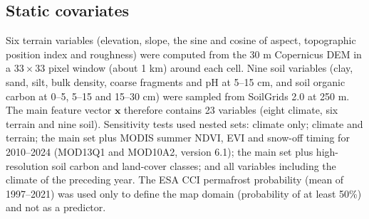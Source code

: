 \subsection{Static covariates}
Six terrain variables (elevation, slope, the sine and cosine of aspect, topographic position index and roughness) were computed from the 30 m Copernicus DEM\cite{CopDEM2021} in a $33\times33$ pixel window (about 1 km) around each cell. Nine soil variables (clay, sand, silt, bulk density, coarse fragments and pH at 5--15 cm, and soil organic carbon at 0--5, 5--15 and 15--30 cm) were sampled from SoilGrids 2.0 at 250 m\cite{Poggio2021}. The main feature vector $\mathbf{x}$ therefore contains 23 variables (eight climate, six terrain and nine soil). Sensitivity tests used nested sets: climate only; climate and terrain; the main set plus MODIS summer NDVI, EVI and snow-off timing for 2010--2024 (MOD13Q1 and MOD10A2, version 6.1)\cite{Didan2021,HallRiggs2021}; the main set plus high-resolution soil carbon and land-cover classes\cite{Palmtag2022}; and all variables including the climate of the preceding year. The ESA CCI permafrost probability (mean of 1997--2021)\cite{Westermann2024} was used only to define the map domain (probability of at least 50\%) and not as a predictor.

